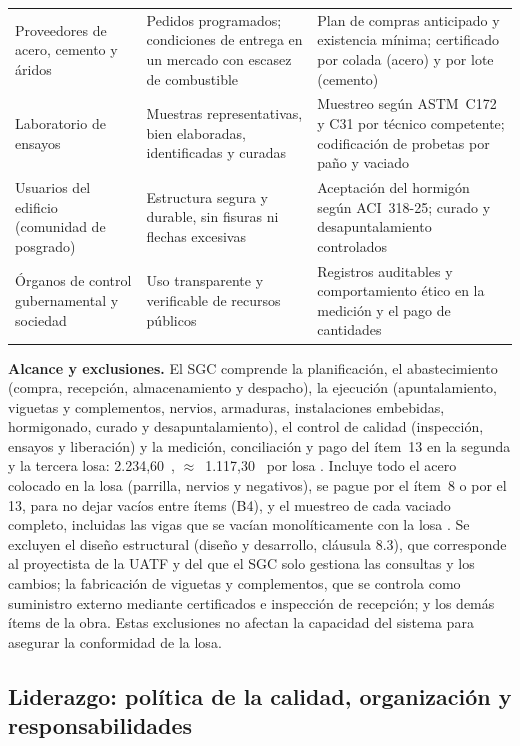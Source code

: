 \begin{longtable}{@{}P{3.2cm}P{5.6cm}P{6.9cm}@{}}
Proveedores de acero, cemento y áridos & Pedidos programados; condiciones de entrega en un mercado con escasez de combustible & Plan de compras anticipado y existencia mínima; certificado por colada (acero) y por lote (cemento) \\
Laboratorio de ensayos & Muestras representativas, bien elaboradas, identificadas y curadas & Muestreo según ASTM~C172 y C31 por técnico competente; codificación de probetas por paño y vaciado \\
Usuarios del edificio (comunidad de posgrado) & Estructura segura y durable, sin fisuras ni flechas excesivas & Aceptación del hormigón según ACI~318-25; curado y desapuntalamiento controlados \\
Órganos de control gubernamental y sociedad & Uso transparente y verificable de recursos públicos & Registros auditables y comportamiento ético en la medición y el pago de cantidades \\
\end{longtable}
\vspace{-6pt}
\endgroup

\textbf{Alcance y exclusiones.} El SGC comprende la planificación, el abastecimiento (compra, recepción, almacenamiento y despacho), la ejecución (apuntalamiento, viguetas y complementos, nervios, armaduras, instalaciones embebidas, hormigonado, curado y desapuntalamiento), el control de calidad (inspección, ensayos y liberación) y la medición, conciliación y pago del ítem~13 en la segunda y la tercera losa: 2.234,60~\mdos{}, $\approx$~1.117,30~\mdos{} por losa \parencite{uatf_pao3}. Incluye todo el acero colocado en la losa (parrilla, nervios y negativos), se pague por el ítem~8 o por el 13, para no dejar vacíos entre ítems (B4), y el muestreo de cada vaciado completo, incluidas las vigas que se vacían monolíticamente con la losa \parencite[p.~3]{uatf_et}. Se excluyen el diseño estructural (diseño y desarrollo, cláusula 8.3), que corresponde al proyectista de la UATF y del que el SGC solo gestiona las consultas y los cambios; la fabricación de viguetas y complementos, que se controla como suministro externo mediante certificados e inspección de recepción; y los demás ítems de la obra. Estas exclusiones no afectan la capacidad del sistema para asegurar la conformidad de la losa.

\subsection{Liderazgo: política de la calidad, organización y responsabilidades}
\label{sec:sgc-liderazgo}

